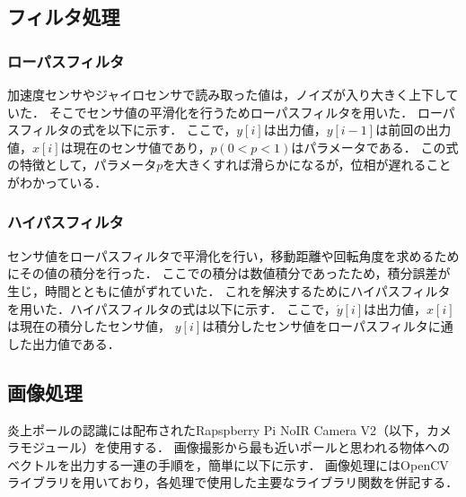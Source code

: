 \documentclass[11pt,a4]{jsarticle}
\begin{document}
  \subsection{フィルタ処理}
    \subsubsection{ローパスフィルタ}
      加速度センサやジャイロセンサで読み取った値は，ノイズが入り大きく上下していた．
      そこでセンサ値の平滑化を行うためローパスフィルタを用いた．
      ローパスフィルタの式を以下に示す．
      ここで，$y[i]$は出力値，$y[i-1]$は前回の出力値，$x[i]$は現在のセンサ値であり，$p(0<p<1)$はパラメータである．
      この式の特徴として，パラメータ$p$を大きくすれば滑らかになるが，位相が遅れることがわかっている．

    \subsubsection{ハイパスフィルタ}
      センサ値をローパスフィルタで平滑化を行い，移動距離や回転角度を求めるためにその値の積分を行った．
      ここでの積分は数値積分であったため，積分誤差が生じ，時間とともに値がずれていた．
      これを解決するためにハイパスフィルタを用いた．ハイパスフィルタの式は以下に示す．
      ここで，$\acute{y}[i]$は出力値，$x[i]$は現在の積分したセンサ値，
      $y[i]$は積分したセンサ値をローパスフィルタに通した出力値である．

  \subsection{画像処理}
    炎上ポールの認識には配布されたRapspberry Pi NoIR Camera V2（以下，カメラモジュール）を使用する．
    画像撮影から最も近いポールと思われる物体へのベクトルを出力する一連の手順を，簡単に以下に示す．
    画像処理にはOpenCVライブラリを用いており，各処理で使用した主要なライブラリ関数を併記する．
\end{document}
